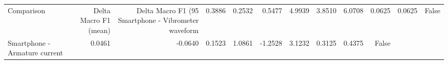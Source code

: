 \begin{tabular}{lrrrrrrrrr}
\toprule
Comparison & Delta Macro F1 (mean) & Delta Macro F1 (95%
\midrule
Smartphone - Vibrometer waveform & 0.3886 & 0.2532 & 0.5477 & 4.9939 & 3.8510 & 6.0708 & 0.0625 & 0.0625 & False \\
Smartphone - Armature current & 0.0461 & -0.0640 & 0.1523 & 1.0861 & -1.2528 & 3.1232 & 0.3125 & 0.4375 & False \\
\bottomrule
\end{tabular}
